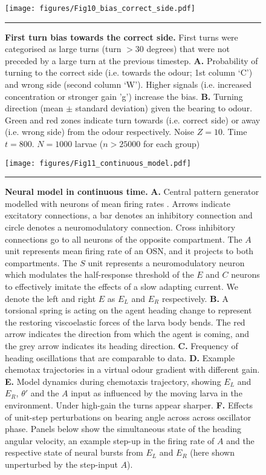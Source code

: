 \documentclass[11pt,a4paper]{article}
\newcommand{\todoBW}[1]{\todo[author=BW,color=orange, size=\tiny,inline]{#1}}
\begin{document}
\begin{figure}
\begin{center}
\texttt{[image: figures/Fig10\_bias\_correct\_side.pdf]}
\caption{{\bf First turn bias towards the correct side.} First turns were categorised as large turns (turn $>30$ degrees) that were not preceded by a large turn at the previous timestep.
{\bf A.} Probability of turning to the correct side (i.e. towards the odour; 1st column ‘C’) and wrong side (second column ‘W’). Higher signals (i.e. increased concentration or stronger gain 'g') increase the bias.
{\bf B.} Turning direction (mean $\pm$ standard deviation) given the bearing to odour. Green and red zones indicate turn towards (i.e. correct side) or away (i.e. wrong side) from the odour respectively. Noise $Z = 10$. Time $t=800$. $N=1000$ larvae ($n > 25000$ for each group)
\label{fig:FirstTurn}}
\hrule
\end{center}
\end{figure}


\begin{figure}
\begin{center}
\texttt{[image: figures/Fig11\_continuous\_model.pdf]}
\caption{{\bf Neural model in continuous time.} {\bf A.} Central pattern generator modelled with neurons of mean firing rates  \citep[adapted from ][]{wilson1999spikes}.
  Arrows indicate excitatory connections, a bar denotes an inhibitory connection and circle denotes a neuromodulatory connection. Cross inhibitory connections go to all neurons of the opposite compartment.
   The $A$ unit represents mean firing rate of an OSN, and it projects to both compartments.
   The $S$ unit represents a neuromodulatory neuron which  modulates the half-response threshold of the $E$ and $C$ neurons  to effectively imitate the effects of a slow adapting current. We denote the left and right $E$ as $E_L$ and $E_R$ respectively.
{\bf B.} A torsional spring is acting on the agent heading change to represent the restoring viscoelastic forces of the larva body bends. The red arrow indicates the direction from which the agent is coming, and the grey arrow indicates its heading direction.
{\bf C.} Frequency of heading oscillations that are comparable to data.
{\bf D.} Example chemotax trajectories in a virtual odour gradient with different gain.
{\bf E.} Model dynamics during chemotaxis trajectory, showing $E_L$ and  $E_R$, $\theta'$ and the $A$ input as influenced by the moving larva in the environment. Under high-gain the turns appear sharper.
{\bf F.} Effects of unit-step perturbations on bearing angle across across oscillator phase.
 Panels below show the simultaneous state of the heading angular velocity, an example step-up in the firing rate of $A$ and the respective state of neural bursts from $E_L$ and $E_R$ (here shown unperturbed by the step-input $A$).
\label{fig:LampreyModel}}
\hrule
\end{center}
\end{figure}
\end{document}
